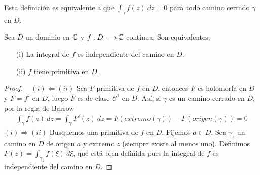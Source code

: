 \begin{obs}
    Esta definición es equivalente a que $\int_{\gamma}{f(z) \ dz} = 0$ para todo camino cerrado $\gamma$ en $D$.
\end{obs}

\begin{teo}
    Sea $D$ un dominio en $\mathbb{C}$ y $f: D \longrightarrow \mathbb{C}$ continua. Son equivalentes:
    \begin{enumerate}
        \item[(i)] La integral de $f$ es independiente del camino en $D$.
        \item[(ii)] $f$ tiene primitiva en $D$.
    \end{enumerate}
\end{teo}

\begin{proof}
    \
    \newline
    $\boxed{(i) \Longleftarrow (ii)}$ Sea $F$ primitiva de $f$ en $D$, entonces $F$ es holomorfa en $D$ y $F = f'$ en $D$, luego $F$ es de clase $\mathcal{C}^1$ en $D$. Así, si $\gamma$ es un camino cerrado en $D$, por la regla de Barrow
    \begin{align*}
        \int_{\gamma}{f(z) \ dz} = \int_{\gamma}{F'(z) \ dz} = F(extremo(\gamma)) - F(origen(\gamma)) = 0
    \end{align*}
    $\boxed{(i) \Longrightarrow (ii)}$ Busquemos una primitiva de $f$ en $D$. Fijemos $a \in D$. Sea $\gamma_z$ un camino en $D$ de origen $a$ y extremo $z$ (siempre existe al menos uno). Definimos $F(z) = \int_{\gamma_z}{f(\xi) \ d\xi}$, que está bien definida pues la integral de $f$ es independiente del camino en $D$.


\end{proof}
